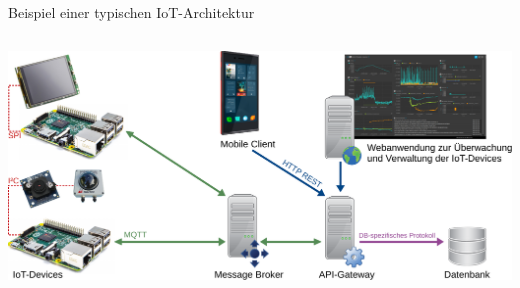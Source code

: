 {

\begin{frame}[plain]
\end{frame}
}

\begin{frame}{Beispiel einer typischen IoT-Architektur}
    \begin{columns}
        \column{\dimexpr\paperwidth-10pt}
        \includegraphics[width=\textwidth]{img/architektur_beispiel}
    \end{columns}
\end{frame}

